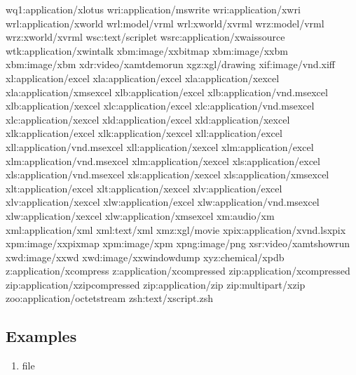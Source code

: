 \documentclass[letterpaper,12pt,english]{sphinxmanual}
\begin{document}
\begin{sphinxVerbatim}[commandchars=\\\{\}]
wq1:application/x\PYGZhy{}lotus
wri:application/mswrite
\PYGZsh{}wri:application/x\PYGZhy{}wri
\PYGZsh{}wrl:application/x\PYGZhy{}world
wrl:model/vrml
\PYGZsh{}wrl:x\PYGZhy{}world/x\PYGZhy{}vrml
\PYGZsh{}wrz:model/vrml
\PYGZsh{}wrz:x\PYGZhy{}world/x\PYGZhy{}vrml
\PYGZsh{}wsc:text/scriplet
wsrc:application/x\PYGZhy{}wais\PYGZhy{}source
wtk:application/x\PYGZhy{}wintalk
\PYGZsh{}xbm:image/x\PYGZhy{}xbitmap
\PYGZsh{}xbm:image/x\PYGZhy{}xbm
xbm:image/xbm
xdr:video/x\PYGZhy{}amt\PYGZhy{}demorun
xgz:xgl/drawing
xif:image/vnd.xiff
xl:application/excel
xla:application/excel
\PYGZsh{}xla:application/x\PYGZhy{}excel
\PYGZsh{}xla:application/x\PYGZhy{}msexcel
\PYGZsh{}xlb:application/excel
\PYGZsh{}xlb:application/vnd.ms\PYGZhy{}excel
xlb:application/x\PYGZhy{}excel
\PYGZsh{}xlc:application/excel
\PYGZsh{}xlc:application/vnd.ms\PYGZhy{}excel
\PYGZsh{}xlc:application/x\PYGZhy{}excel
xld:application/excel
\PYGZsh{}xld:application/x\PYGZhy{}excel
\PYGZsh{}xlk:application/excel
xlk:application/x\PYGZhy{}excel
\PYGZsh{}xll:application/excel
\PYGZsh{}xll:application/vnd.ms\PYGZhy{}excel
xll:application/x\PYGZhy{}excel
\PYGZsh{}xlm:application/excel
\PYGZsh{}xlm:application/vnd.ms\PYGZhy{}excel
xlm:application/x\PYGZhy{}excel
\PYGZsh{}xls:application/excel
\PYGZsh{}xls:application/vnd.ms\PYGZhy{}excel
\PYGZsh{}xls:application/x\PYGZhy{}excel
xls:application/x\PYGZhy{}msexcel
\PYGZsh{}xlt:application/excel
xlt:application/x\PYGZhy{}excel
\PYGZsh{}xlv:application/excel
xlv:application/x\PYGZhy{}excel
\PYGZsh{}xlw:application/excel
\PYGZsh{}xlw:application/vnd.ms\PYGZhy{}excel
\PYGZsh{}xlw:application/x\PYGZhy{}excel
xlw:application/x\PYGZhy{}msexcel
xm:audio/xm
\PYGZsh{}xml:application/xml
xml:text/xml
xmz:xgl/movie
xpix:application/x\PYGZhy{}vnd.ls\PYGZhy{}xpix
\PYGZsh{}xpm:image/x\PYGZhy{}xpixmap
xpm:image/xpm
x\PYGZhy{}png:image/png
xsr:video/x\PYGZhy{}amt\PYGZhy{}showrun
\PYGZsh{}xwd:image/x\PYGZhy{}xwd
xwd:image/x\PYGZhy{}xwindowdump
xyz:chemical/x\PYGZhy{}pdb
\PYGZsh{}z:application/x\PYGZhy{}compress
z:application/x\PYGZhy{}compressed
\PYGZsh{}zip:application/x\PYGZhy{}compressed
\PYGZsh{}zip:application/x\PYGZhy{}zip\PYGZhy{}compressed
zip:application/zip
\PYGZsh{}zip:multipart/x\PYGZhy{}zip
zoo:application/octet\PYGZhy{}stream
zsh:text/x\PYGZhy{}script.zsh
\end{sphinxVerbatim}


\subsection{Examples}
\label{\detokenize{s3:examples}}\begin{enumerate}
%
\item {} 
\sphinxAtStartPar
{} file

\end{enumerate}
\end{document}
